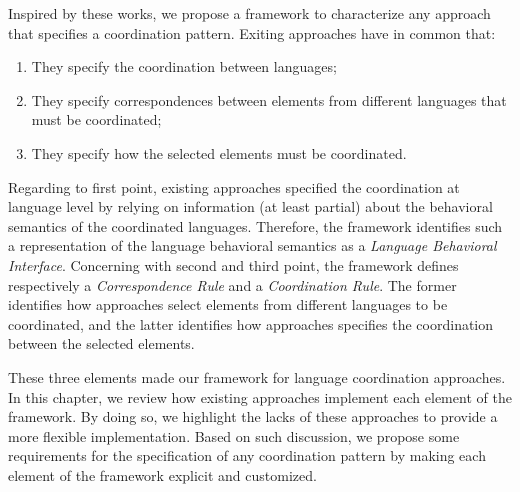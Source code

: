 Inspired by these works, we propose a framework to characterize any approach that specifies a coordination pattern. Exiting approaches have in common that:
\begin{enumerate}
	\item They specify the coordination between languages;
	\item They specify correspondences between elements from different languages that must be coordinated;
	\item They specify how the selected elements must be coordinated.  
\end{enumerate}	
Regarding to first point, existing approaches specified the coordination at language level by relying on information (at least partial) about the behavioral semantics of the coordinated languages. Therefore, the framework identifies such a representation of the language behavioral semantics as a \emph{Language Behavioral Interface}. Concerning with second and third point, the framework defines respectively a \emph{Correspondence Rule} and a \emph{Coordination Rule}. The former identifies how approaches select elements from different languages to be coordinated, and the latter identifies how approaches specifies the coordination between the selected elements.

These three elements made our framework for language coordination approaches. In this chapter, we review how existing approaches implement each element of the framework. By doing so, we highlight the lacks of these approaches to provide a more flexible implementation. Based on such discussion, we propose some requirements for the specification of any coordination pattern by making each element of the framework explicit and customized. 

